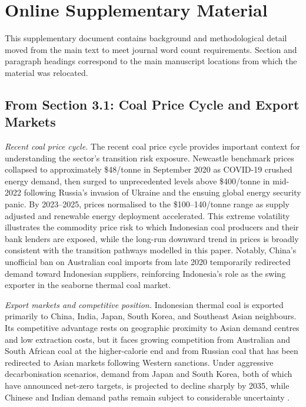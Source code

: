 
\section*{Online Supplementary Material}

This supplementary document contains background and methodological detail moved from the main text to meet journal word count requirements. Section and paragraph headings correspond to the main manuscript locations from which the material was relocated.

\subsection*{From Section 3.1: Coal Price Cycle and Export Markets}

\textit{Recent coal price cycle.} The recent coal price cycle provides important context for understanding the sector's transition risk exposure. Newcastle benchmark prices collapsed to approximately \$48/tonne in September 2020 as COVID-19 crushed energy demand, then surged to unprecedented levels above \$400/tonne in mid-2022 following Russia's invasion of Ukraine and the ensuing global energy security panic. By 2023--2025, prices normalised to the \$100--140/tonne range as supply adjusted and renewable energy deployment accelerated. This extreme volatility illustrates the commodity price risk to which Indonesian coal producers and their bank lenders are exposed, while the long-run downward trend in prices is broadly consistent with the transition pathways modelled in this paper. Notably, China's unofficial ban on Australian coal imports from late 2020 temporarily redirected demand toward Indonesian suppliers, reinforcing Indonesia's role as the swing exporter in the seaborne thermal coal market.

\textit{Export markets and competitive position.} Indonesian thermal coal is exported primarily to China, India, Japan, South Korea, and Southeast Asian neighbours. Its competitive advantage rests on geographic proximity to Asian demand centres and low extraction costs, but it faces growing competition from Australian and South African coal at the higher-calorie end and from Russian coal that has been redirected to Asian markets following Western sanctions. Under aggressive decarbonisation scenarios, demand from Japan and South Korea, both of which have announced net-zero targets, is projected to decline sharply by 2035, while Chinese and Indian demand paths remain subject to considerable uncertainty \citep{IEA2023, Mendelevitch2019}.

